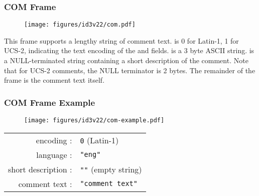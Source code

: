 \clearpage

\subsubsection{COM Frame}
\begin{figure}[h]
\texttt{[image: figures/id3v22/com.pdf]}
\end{figure}
\par
\noindent
This frame supports a lengthy string of comment text.
 is 0 for Latin-1, 1 for UCS-2,
indicating the text encoding of the 
and  fields.
 is a 3 byte ASCII string.
 is a NULL-terminated string
containing a short description of the comment.
Note that for UCS-2 comments, the NULL terminator is 2 bytes.
The remainder of the frame is the comment text itself.

\subsubsection{COM Frame Example}
\begin{figure}[h]
  \texttt{[image: figures/id3v22/com-example.pdf]}
\end{figure}
\begin{table}[h]
  \begin{tabular}{rl}
    encoding : & \texttt{0} (Latin-1) \\
    language : & \texttt{"eng"} \\
    short description : & \texttt{""} (empty string) \\
    comment text : & \texttt{"comment text"} \\
  \end{tabular}
\end{table}

\clearpage

